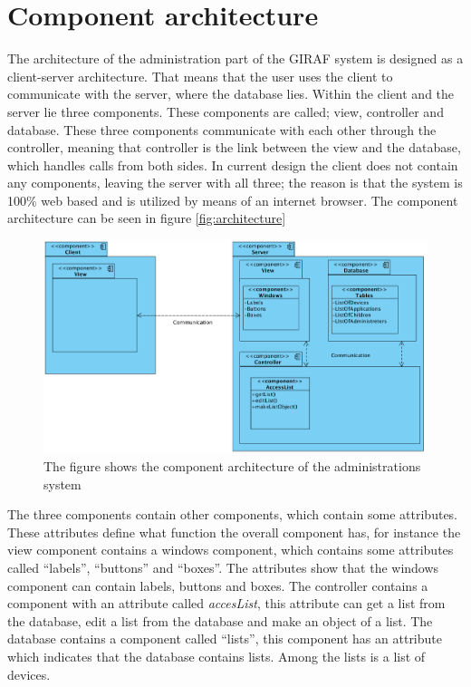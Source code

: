 \section{Component architecture}

The architecture of the administration part of the GIRAF system is designed as a client-server architecture. That means that the user uses the client to communicate with the server, where the database lies. Within the client and the server lie three components. These components are called; view, controller and database. These three components communicate with each other through the controller, meaning that controller is the link between the view and the database, which handles calls from both sides. In current design the client does not contain any components, leaving the server with all three; the reason is that the system is 100\% web based and is utilized by means of an internet browser. The component architecture can be seen in figure \vref{fig:architecture}

\begin{figure}[!ht]
\centering
\includegraphics[width=1.0\textwidth]{img/ComponentArketektur.png}
\caption{The figure shows the component architecture of the administrations system}
\label{fig:architecture}
\end{figure}

The three components contain other components, which contain some attributes. These attributes define what function the overall component has, for instance the view component contains a windows component, which contains some attributes called ``labels'', ``buttons'' and ``boxes''. The attributes show that the windows component can contain labels, buttons and boxes.
The controller contains a component with an attribute called \emph{accesList}, this attribute can get a list from the database, edit a list from the database and make an object of a list.
The database contains a component called ``lists'', this component has an attribute which indicates that the database contains lists. Among the lists is a list of devices.